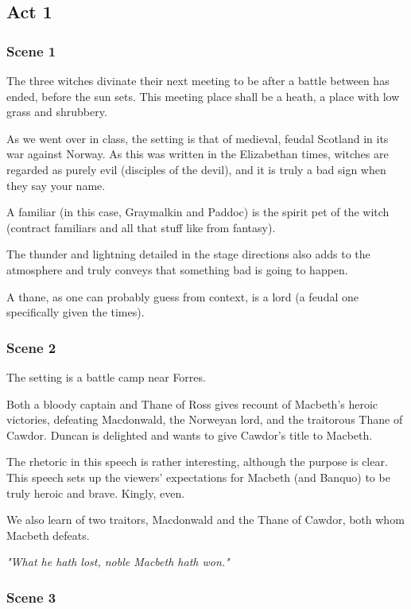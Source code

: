 \subsection{Act 1}

\subsubsection{Scene 1}

The three witches divinate their next meeting to be after a battle between has
ended, before the sun sets. This meeting place shall be a heath, a place with
low grass and shrubbery.

As we went over in class, the setting is that of medieval, feudal Scotland in its war against Norway. As this was written in the Elizabethan times, witches are regarded as purely evil (disciples of the devil), and it is truly a bad sign when they say your name.

A familiar (in this case, Graymalkin and Paddoc) is the spirit pet of the witch
(contract familiars and all that stuff like from fantasy).

The thunder and lightning detailed in the stage directions also adds to the atmosphere and truly conveys that something bad is going to happen.

A thane, as one can probably guess from context, is a lord (a feudal one specifically given the times).

\subsubsection{Scene 2}

The setting is a battle camp near Forres.

Both a bloody captain and Thane of Ross gives recount of Macbeth's heroic
victories, defeating Macdonwald, the Norweyan lord, and the traitorous Thane of
Cawdor. Duncan is delighted and wants to give Cawdor's title to Macbeth.

The rhetoric in this speech is rather interesting, although the purpose is
clear. This speech sets up the viewers' expectations for Macbeth (and Banquo)
to be truly heroic and brave. Kingly, even.

We also learn of two traitors, Macdonwald and the Thane of Cawdor, both whom
Macbeth defeats.

\textit{"What he hath lost, noble Macbeth hath won."}

\subsubsection{Scene 3}

